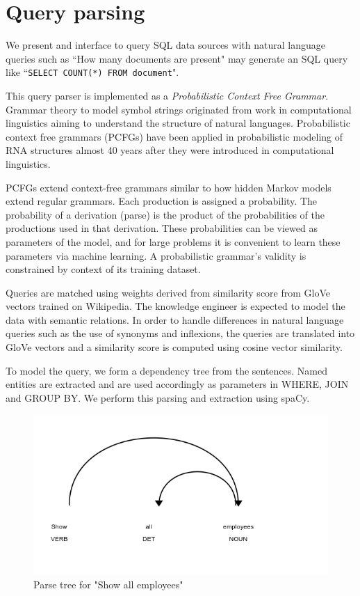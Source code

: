 \documentclass[a4paper,12pt,oneside]{book}
\begin{document}
\section{Query parsing}
We present and interface to query SQL data sources with natural language queries such as ``How many documents are present" may generate an SQL query like ``\texttt{SELECT COUNT(*) FROM document}".

This query parser is implemented as a \textit{Probabilistic Context Free Grammar}. Grammar theory to model symbol strings originated from work in computational linguistics aiming to understand the structure of natural languages. Probabilistic context free grammars (PCFGs) have been applied in probabilistic modeling of RNA structures almost 40 years after they were introduced in computational linguistics.

PCFGs extend context-free grammars similar to how hidden Markov models extend regular grammars. Each production is assigned a probability. The probability of a derivation (parse) is the product of the probabilities of the productions used in that derivation. These probabilities can be viewed as parameters of the model, and for large problems it is convenient to learn these parameters via machine learning. A probabilistic grammar's validity is constrained by context of its training dataset.

Queries are matched using weights derived from similarity score from GloVe vectors trained on Wikipedia. The knowledge engineer is expected to model the data with semantic relations. In order to handle differences in natural language queries such as the use of synonyms and inflexions, the queries are translated into GloVe vectors and a similarity score is computed using cosine vector similarity.

To model the query, we form a dependency tree from the sentences. Named entities are extracted and are used accordingly as parameters in WHERE, JOIN and GROUP BY. We perform this parsing and extraction using spaCy\cite{spacy}.

\begin{figure}
    \centering
    \includegraphics[width=\textwidth]{images/Show-all-employees.png}
    \caption{Parse tree for "Show all employees"}
    \label{fig:example_1}
\end{figure}
\end{document}
